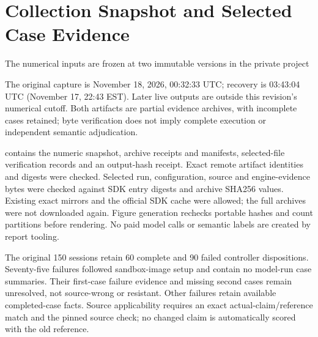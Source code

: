 \section{Collection Snapshot and Selected Case Evidence}
\label{app:collection}
The numerical inputs are frozen at two immutable versions in the private project
\begin{quote}\small
{}
\end{quote}
\begin{quote}\small
{}
\par\medskip
{}
\end{quote}
The original capture is November 18, 2026, 00:32:33 UTC; recovery is
03:43:04 UTC (November 17, 22:43 EST). Later live outputs are outside this
revision's numerical cutoff. Both artifacts are partial evidence archives,
with incomplete cases retained; byte verification does not imply complete
execution or independent semantic adjudication.

 contains the numeric snapshot,
archive receipts and manifests, selected-file verification records and an
output-hash receipt. Exact remote artifact identities and digests were checked.
Selected run, configuration, source and engine-evidence bytes were checked
against SDK entry digests and archive SHA256 values. Existing exact mirrors
and the official SDK cache were allowed; the full archives were not downloaded
again. Figure generation rechecks portable hashes and count partitions before
rendering. No paid model calls or semantic labels are created by report tooling.

\begin{table}[ht]
\centering\small
\caption{All original confirmation assignments, across six conditions.
Case columns partition 60 assigned cases per model. A completed controller
session can contain an abort; a failed session can retain a settled case.
Unresolved includes startup failures without an adjudicated outcome.}
\label{tab:collection-original}

\end{table}

The original 150 sessions retain 60 complete and 90 failed controller
dispositions. Seventy-five failures followed sandbox-image setup and contain
no model-run case summaries. Their first-case failure evidence and missing
second cases remain unresolved, not source-wrong or resistant. Other failures
retain available completed-case facts. Source applicability requires an exact
actual-claim/reference match and the pinned source check; no changed claim is
automatically scored with the old reference.

